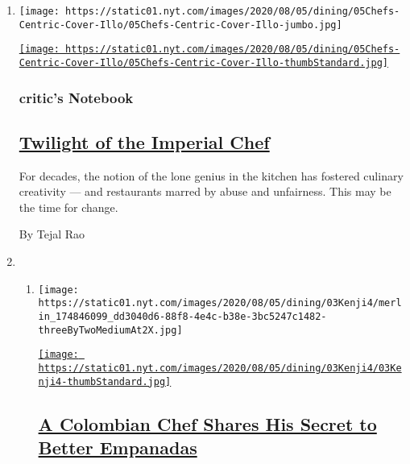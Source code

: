 \begin{enumerate}
\def\labelenumi{\arabic{enumi}.}
\item
  \texttt{[image: https://static01.nyt.com/images/2020/08/05/dining/05Chefs-Centric-Cover-Illo/05Chefs-Centric-Cover-Illo-jumbo.jpg]}

  \href{/2020/08/04/dining/chef-restaurant-culture.html}{\texttt{[image: https://static01.nyt.com/images/2020/08/05/dining/05Chefs-Centric-Cover-Illo/05Chefs-Centric-Cover-Illo-thumbStandard.jpg]}}

  \hypertarget{critics-notebook}{%
  \subsubsection{critic's Notebook}\label{critics-notebook}}

  \hypertarget{twilight-of-the-imperial-chef}{%
  \subsection{\texorpdfstring{\href{/2020/08/04/dining/chef-restaurant-culture.html}{Twilight
  of the Imperial
  Chef}}{Twilight of the Imperial Chef}}\label{twilight-of-the-imperial-chef}}

  For decades, the notion of the lone genius in the kitchen has fostered
  culinary creativity --- and restaurants marred by abuse and
  unfairness. This may be the time for change.

  By Tejal Rao
\item
  \begin{enumerate}
  \def\labelenumii{\arabic{enumii}.}
  \item
    \texttt{[image: https://static01.nyt.com/images/2020/08/05/dining/03Kenji4/merlin\_174846099\_dd3040d6-88f8-4e4c-b38e-3bc5247c1482-threeByTwoMediumAt2X.jpg]}

    \href{/2020/08/04/dining/colombian-empanadas-carlos-gaviria.html}{\texttt{[image: https://static01.nyt.com/images/2020/08/05/dining/03Kenji4/03Kenji4-thumbStandard.jpg]}}

    \hypertarget{a-colombian-chef-shares-his-secret-to-better-empanadas}{%
    \subsection{\texorpdfstring{\href{/2020/08/04/dining/colombian-empanadas-carlos-gaviria.html}{A
    Colombian Chef Shares His Secret to Better
    Empanadas}}{A Colombian Chef Shares His Secret to Better Empanadas}}\label{a-colombian-chef-shares-his-secret-to-better-empanadas}}


\end{enumerate}
\end{enumerate}
